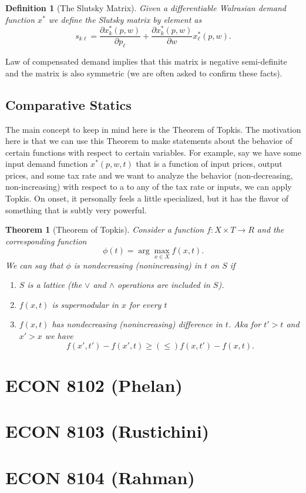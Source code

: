 \documentclass[11pt,english]{article}
\newtheorem{theorem}{Theorem}[section]
\newtheorem{definition}{Definition}[section]
\begin{document}
\begin{definition}[The Slutsky Matrix]
Given a differentiable Walrasian demand function $x^*$ we define the Slutsky matrix by element as $$s_{k\ell} = \frac{\partial x^*_k(p,w)}{\partial p_\ell} + \frac{\partial x^*_k(p,w)}{\partial w}x^*_\ell(p,w).$$
\end{definition} Law of compensated demand implies that this matrix is negative semi-definite and the matrix is also symmetric (we are often asked to confirm these facts).

\subsection{Comparative Statics}
The main concept to keep in mind here is the Theorem of Topkis. The motivation here is that we can use this Theorem to make statements about the behavior of certain functions with respect to certain variables. For example, say we have some input demand function $x^*(p,w,t)$ that is a function of input prices, output prices, and some tax rate and we want to analyze the behavior (non-decreasing, non-increasing) with respect to a to any of the tax rate or inputs, we can apply Topkis. On onset, it personally feels a little specialized, but it has the flavor of something that is subtly very powerful.

\begin{theorem}[Theorem of Topkis]
Consider a function $f:X\times T \to R$ and the corresponding function $$\phi(t) = \arg\max_{x\in X}f(x,t).$$ We can say that $\phi$ is nondecreasing (nonincreasing) in $t$ on $S$ if
\begin{enumerate}
\item $S$ is a lattice (the $\lor$ and $\land$ operations are included in $S$).

\item $f(x,t)$ is supermodular in $x$ for every $t$

\item $f(x,t)$ has nondecreasing (nonincreasing) difference in $t$. Aka for $t' > t$ and $x' > x$ we have $$f(x',t') - f(x', t) \geq (\leq) f(x,t') - f(x, t).$$
\end{enumerate}
\end{theorem}

\section{ECON 8102 (Phelan)}

\section{ECON 8103 (Rustichini)}

\section{ECON 8104 (Rahman)}
\end{document}
